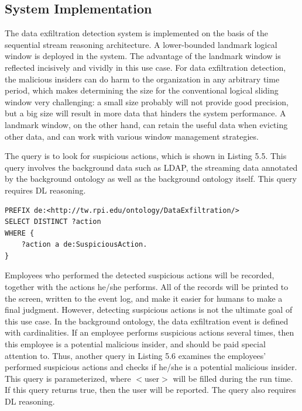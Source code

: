 \subsection{System Implementation}
The data exfiltration detection system is implemented on the basis of the sequential stream reasoning architecture. 
A lower-bounded landmark logical window is deployed in the system. 
The advantage of the landmark window is reflected incisively and vividly in this use case. 
For data exfiltration detection, the malicious insiders can do harm to the organization in any arbitrary time period, which makes determining the size for the conventional logical sliding window very challenging: a small size probably will not provide good precision, but a big size will result in more data that hinders the system performance. 
A landmark window, on the other hand, can retain the useful data when evicting other data, and can work with various window management strategies. 

The query is to look for suspicious actions, which is shown in Listing 5.5. 
This query involves the background data such as LDAP, the streaming data annotated by the background ontology as well as the background ontology itself.
This query requires DL reasoning. 

\begin{lstlisting}[caption={\textbf{Suspicious Action Query}},basicstyle=\small]
PREFIX de:<http://tw.rpi.edu/ontology/DataExfiltration/>
SELECT DISTINCT ?action 
WHERE { 
    ?action a de:SuspiciousAction.
}
\end{lstlisting}

Employees who performed the detected suspicious actions will be recorded, together with the actions he/she performs. 
All of the records will be printed to the screen, written to the event log, and make it easier for humans to make a final judgment. 
However, detecting suspicious actions is not the ultimate goal of this use case.
In the background ontology, the data exfiltration event is defined with cardinalities.
If an employee performs suspicious actions several times, then this employee is a potential malicious insider, and should be paid special attention to. 
Thus, another query in Listing 5.6 examines the employees' performed suspicious actions and checks if he/she is a potential malicious insider. 
This query is parameterized, where $<$user$>$ will be filled during the run time. 
If this query returns true, then the user will be reported. 
The query also requires DL reasoning. 

